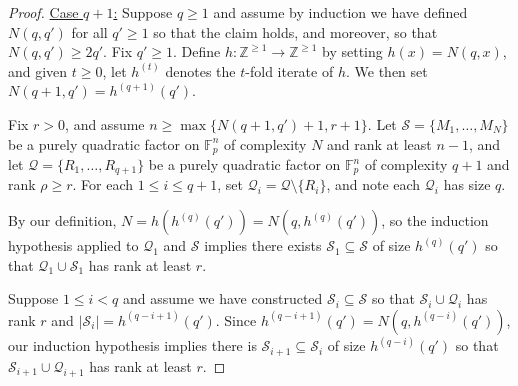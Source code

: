 \documentclass[12pt,oneside,british,a4wide]{amsart}
\numberwithin{equation}{section}
\theoremstyle{definition}
\def\F{\mathbb{F}}
\newcommand{\calQ}{\mathcal{Q}}
\newcommand{\calS}{\mathcal{S}}
\begin{document}
\begin{proof}
\underline{Case $q+1$:}  Suppose $q\geq 1$ and assume by induction we have defined $N(q,q')$ for all $q'\geq 1$ so that the claim holds, and moreover, so that $N(q,q')\geq 2q'$.   Fix $q'\geq 1$.  Define  $h:\mathbb{Z}^{\geq 1}\rightarrow \mathbb{Z}^{\geq 1}$ by setting $h(x)=N(q,x)$, and given $t\geq 0$, let $h^{(t)}$ denotes the $t$-fold iterate of $h$.  We then set $N(q+1,q')=h^{(q+1)}(q')$.  

Fix $r>0$, and assume $n\geq \max\{N(q+1,q')+1, r+1\}$. Let $\calS=\{M_1,\ldots, M_{N}\}$ be a purely quadratic factor on $\F_p^n$ of complexity $N$ and rank at least $n-1$, and let $\calQ=\{R_1,\ldots, R_{q+1}\}$ be a purely quadratic factor on $\F_p^n$ of complexity $q+1$ and rank $\rho \geq r$.  For each $1\leq i\leq q+1$, set $\calQ_i=\calQ\setminus \{R_i\}$, and note each $\calQ_i$ has size $q$.

By our definition, $N=h(h^{(q)}(q'))=N(q,h^{(q)}(q'))$, so the induction hypothesis applied to $\calQ_1$ and $\calS$ implies there exists $\calS_1\subseteq \calS$ of size $h^{(q)}(q')$ so that $\calQ_1\cup \calS_1$ has rank at least $r$.  

Suppose $1\leq i<q$ and assume we have constructed $\calS_i\subseteq \calS$ so that $\calS_i\cup \calQ_i$ has rank   $r$ and $|\calS_i|=h^{(q-i+1)}(q')$.  Since $h^{(q-i+1)}(q')=N(q,h^{(q-i)}(q'))$, our induction hypothesis implies there is $\calS_{i+1}\subseteq \calS_i$ of size $h^{(q-i)}(q')$ so that $\calS_{i+1}\cup \calQ_{i+1}$ has rank at least $r$.


\end{proof}
\end{document}
